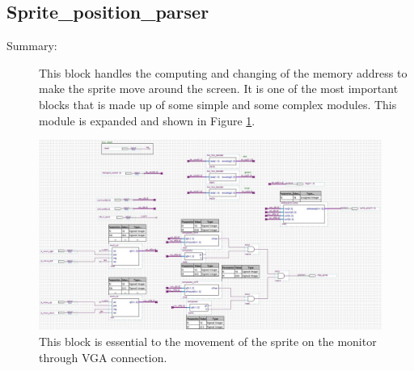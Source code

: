 \documentclass[a4paper]{article}
\begin{document}
\subsection{Sprite\_position\_parser}
\begin{description}
    \item[Summary: ] This block handles the computing and changing of the memory address to make the sprite move around the screen. It is one of the most important blocks that is made up of some simple and some complex modules. This module is expanded and shown in Figure \ref{fig:spriteParses}.
    
    
        
\end{description}

\begin{figure}[H]
    \centering
    \includegraphics[width=5.9in]{Images/Sprite_Position_Parser.jpg}
    \caption{This block is essential to the movement of the sprite on the monitor through VGA connection.}
    \label{fig:spriteParses}
\end{figure}
\end{document}
